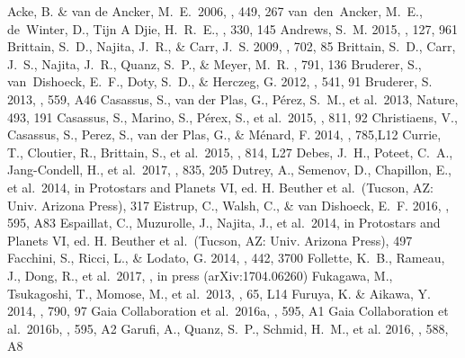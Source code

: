 \documentclass[onecolumn]{aastex6}
\begin{document}
\begin{thebibliography}{}
 Acke, B. \& van de Ancker, M.~E.~2006, \aap, 449, 267
 van~den~Ancker, M.~E., de~Winter, D., Tijn A Djie, H.~R.~E., \aap, 330, 145
 Andrews, S.~M. 2015, \pasp, 127, 961
 Brittain, S.~D., Najita, J.~R., \& Carr, J.~S. 2009, \apj, 702, 85
 Brittain, S.~D., Carr, J.~S., Najita, J.~R., Quanz, S.~P., \& Meyer, M.~R. \apj, 791, 136
 Bruderer, S., van~Dishoeck, E.~F., Doty, S.~D., \& Herczeg, G. 2012, \aap, 541, 91
 Bruderer, S. 2013, \aap, 559, A46
 Casassus, S., van der Plas, G., P\'{e}rez, S.~M., et al.~2013, Nature, 493, 191
 Casassus, S., Marino, S., P\'{e}rex, S., et al.~2015, \apj, 811, 92
 Christiaens, V., Casassus, S., Perez, S., van der Plas, G., \& M\'{e}nard, F. 2014, \apjl, 785,L12
 Currie, T., Cloutier, R., Brittain, S., et al.~2015, \apjl, 814, L27
 Debes, J.~H., Poteet, C.~A., Jang-Condell, H., et al.~2017, \apj, 835, 205
 Dutrey, A., Semenov, D., Chapillon, E., et al.~2014, in Protostars and Planets VI, ed. H. Beuther et al.~(Tucson, AZ: Univ. Arizona Press), 317
 Eistrup, C., Walsh, C., \& van Dishoeck, E.~F. 2016, \aap, 595, A83
 Espaillat, C., Muzurolle, J., Najita, J., et al.~2014, in Protostars and Planets VI, ed. H. Beuther et al.~(Tucson, AZ: Univ. Arizona Press), 497
 Facchini, S., Ricci, L., \& Lodato, G. 2014, \mnras, 442, 3700
 Follette, K.~B., Rameau, J., Dong, R., et al.~2017, \aj, in press (arXiv:1704.06260)
 Fukagawa, M., Tsukagoshi, T., Momose, M., et al.~2013, \pasj, 65, L14
 Furuya, K. \& Aikawa, Y. 2014, \apj, 790, 97
 Gaia Collaboration et al.~2016a, \aap, 595, A1
 Gaia Collaboration et al.~2016b, \aap, 595, A2
 Garufi, A., Quanz, S.~P., Schmid, H.~M., et al. 2016, \aap, 588, A8 

\end{thebibliography}
\end{document}

